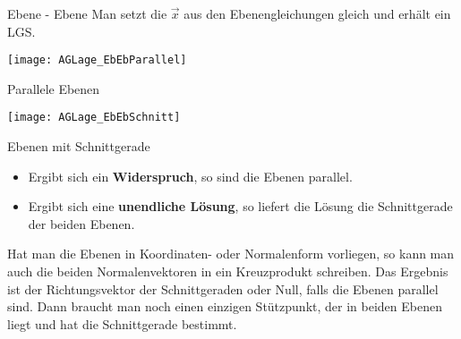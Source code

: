 \begin{bla}{Ebene - Ebene}
  Man setzt die $\vec{x}$ aus den Ebenengleichungen gleich und erhält ein LGS.
  \begin{marginfigure}[0em]
    \texttt{[image: AGLage\_EbEbParallel]}
    \caption{Parallele Ebenen}
  \end{marginfigure}
  \begin{marginfigure}[0em]
    \texttt{[image: AGLage\_EbEbSchnitt]}
    \caption{Ebenen mit Schnittgerade}
  \end{marginfigure}
  \begin{itemize}
    \item Ergibt sich ein \textbf{Widerspruch}, so sind die Ebenen parallel.
    \item Ergibt sich eine \textbf{unendliche Lösung}, so liefert die Lösung die Schnittgerade der beiden Ebenen.
  \end{itemize}

  Hat man die Ebenen in Koordinaten- oder Normalenform vorliegen, so kann man auch die beiden Normalenvektoren in ein Kreuzprodukt schreiben.
  Das Ergebnis ist der Richtungsvektor der Schnittgeraden oder Null, falls die Ebenen parallel sind.
  Dann braucht man noch einen einzigen Stützpunkt, der in beiden Ebenen liegt und hat die Schnittgerade bestimmt.
\end{bla}

